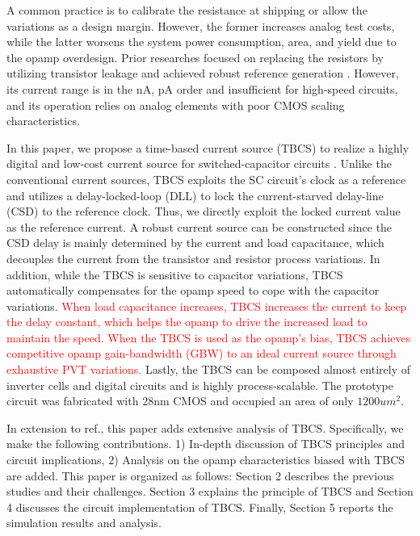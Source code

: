 \documentclass[paper]{ieice}
\begin{document}
A common practice is to calibrate the resistance at shipping or allow the variations as a design margin. However, the former increases analog test costs, while the latter worsens the system power consumption, area, and yield due to the opamp overdesign. Prior researches focused on replacing the resistors by utilizing transistor leakage and achieved robust reference generation \cite{hirose2010nano, hirose2010cmos, osaki20131, choi201423pw}. However, its current range is in the nA, pA order and insufficient for high-speed circuits, and its operation relies on analog elements with poor CMOS scaling characteristics.

In this paper, we propose a time-based current source (TBCS) to realize a highly digital and low-cost current source for switched-capacitor circuits \cite{yoshioka201728}. Unlike the conventional current sources, TBCS exploits the SC circuit's clock as a reference and utilizes a delay-locked-loop (DLL) to lock the current-starved delay-line (CSD) to the reference clock. Thus, we directly exploit the locked current value as the reference current. 
A robust current source can be constructed since the CSD delay is mainly determined by the current and load capacitance, which decouples the current from the transistor and resistor process variations. In addition, while the TBCS is sensitive to capacitor variations, TBCS automatically compensates for the opamp speed to cope with the capacitor variations. 
\textcolor{red}{When load capacitance increases, TBCS increases the current to keep the delay constant, which helps the opamp to drive the increased load to maintain the speed. When the TBCS is used as the opamp's bias, TBCS achieves competitive opamp gain-bandwidth (GBW) to an ideal current source through exhaustive PVT variations.}
Lastly, the TBCS can be composed almost entirely of inverter cells and digital circuits and is highly process-scalable. The prototype circuit was fabricated with 28nm CMOS and occupied an area of only $1200um^2$.

In extension to ref.\cite{yoshioka201728, yoshioka2019digital}, this paper adds extensive analysis of TBCS. Specifically, we make the following contributions. 1) In-depth discussion of TBCS principles and circuit implications, 2) Analysis on the opamp characteristics biased with TBCS are added.
This paper is organized as follows: Section 2 describes the previous studies and their challenges. Section 3 explains the principle of TBCS and Section 4 discusses the circuit implementation of TBCS. Finally, Section 5 reports the simulation results and analysis.
\end{document}

